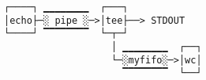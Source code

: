 \documentclass[varwidth,crop]{standalone}
\begin{document}
\begin{verbatim}
┌────┐ ▁▁▁▁▁▁▁▁  ┌───┐   
│echo├─░ pipe ░─>│tee├──> STDOUT
└────┘ ▔▔▔▔▔▔▔▔  └─┬─┘   
                   │ ▁▁▁▁▁▁▁▁  ┌──┐
                   └─░myfifo░─>│wc│
                     ▔▔▔▔▔▔▔▔  └──┘
\end{verbatim}
\end{document}
